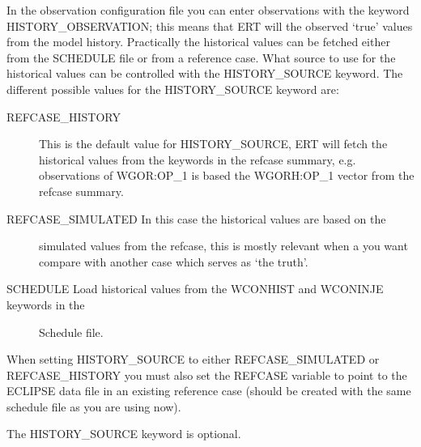 \documentclass[a4paper,10pt,english]{sphinxmanual}
\begin{document}
\begin{sphinxShadowBox}

In the observation configuration file you can enter
observations with the keyword HISTORY\_OBSERVATION; this means
that ERT will the observed ‘true’ values from the model
history. Practically the historical values can be fetched
either from the SCHEDULE file or from a reference case. What
source to use for the historical values can be controlled with
the HISTORY\_SOURCE keyword. The different possible values for
the HISTORY\_SOURCE keyword are:
\begin{description}
\item[{REFCASE\_HISTORY}] \leavevmode
This is the default value for HISTORY\_SOURCE,
ERT will fetch the historical values from the 
keywords in the refcase summary, e.g. observations of
WGOR:OP\_1 is based the WGORH:OP\_1 vector from the
refcase summary.

\item[{REFCASE\_SIMULATED In this case the historical values are based on the}] \leavevmode
simulated values from the refcase, this is mostly relevant when a you want
compare with another case which serves as ‘the truth’.

\item[{SCHEDULE Load historical values from the WCONHIST and WCONINJE keywords in the}] \leavevmode
Schedule file.

\end{description}

When setting HISTORY\_SOURCE to either REFCASE\_SIMULATED or REFCASE\_HISTORY you
must also set the REFCASE variable to point to the ECLIPSE data file in an
existing reference case (should be created with the same schedule file as you
are using now).


%
\begin{sphinxVerbatim}[commandchars=\\\{\}]
      
  
         
\end{sphinxVerbatim}

The HISTORY\_SOURCE keyword is optional.
\end{sphinxShadowBox}
\end{document}
